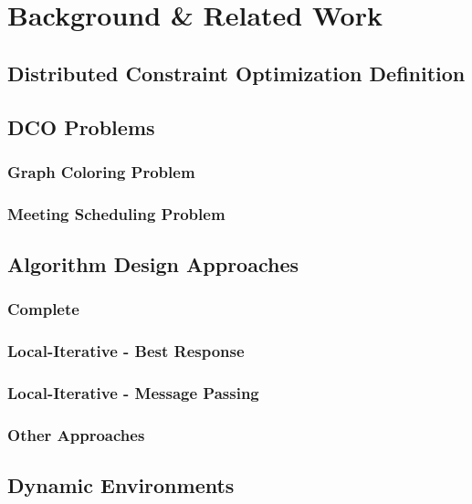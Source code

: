\chapter{Background \& Related Work}
\section{Distributed Constraint Optimization Definition}
\section{DCO Problems}
\subsection{Graph Coloring Problem}
\subsection{Meeting Scheduling Problem}
\section{Algorithm Design Approaches}
\subsection{Complete}
\subsection{Local-Iterative - Best Response}
\subsection{Local-Iterative - Message Passing}
\subsection{Other Approaches}
\section{Dynamic Environments}

%
%
%
